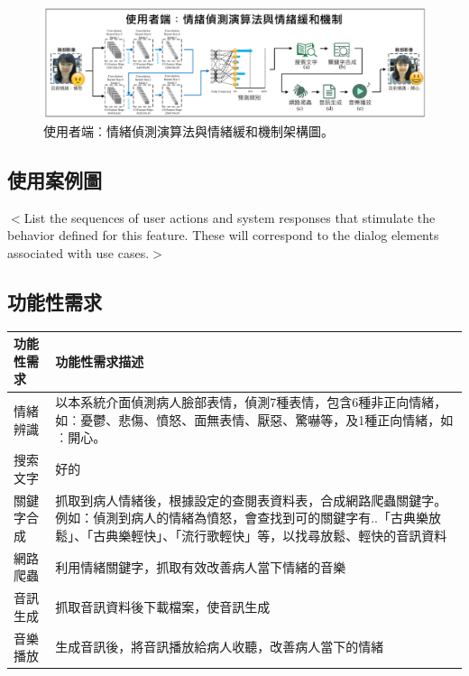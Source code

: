 \documentclass[12pt]{scrreprt}
\begin{document}
\begin{figure}[!h]
\begin{center}
\includegraphics[width=1\textwidth]{./figs/FrameworkFirstAndSecond.pdf}
\end{center}
\caption{使用者端︰情緒偵測演算法與情緒緩和機制架構圖。}
\label{fig:FrameworkFirstAndSecond}
\end{figure}

\subsection{使用案例圖}
$<$List the sequences of user actions and system responses that stimulate the 
behavior defined for this feature. These will correspond to the dialog elements 
associated with use cases.$>$

\subsection{功能性需求}

\begin{center}  
\begin{tabular}{|l| p{10cm}|}  
\hline  
功能性需求 & 功能性需求描述   \\ \hline  
情緒辨識 &以本系統介面偵測病人臉部表情，偵測7種表情，包含6種非正向情緒，如︰憂鬱、悲傷、憤怒、面無表情、厭惡、驚嚇等，及1種正向情緒，如︰開心。    \\ \hline  
搜索文字& 好的\\\hline
關鍵字合成 & 抓取到病人情緒後，根據設定的查閱表資料表，合成網路爬蟲關鍵字。例如：偵測到病人的情緒為憤怒，會查找到可的關鍵字有..「古典樂放鬆」、「古典樂輕快」、「流行歌輕快」等，以找尋放鬆、輕快的音訊資料    \\ \hline  
網路爬蟲 & 利用情緒關鍵字，抓取有效改善病人當下情緒的音樂 \\ \hline
音訊生成 & 抓取音訊資料後下載檔案，使音訊生成 \\ \hline
音樂播放 & 生成音訊後，將音訊播放給病人收聽，改善病人當下的情緒 \\ \hline

\end{tabular}  
\end{center}  
\end{document}
